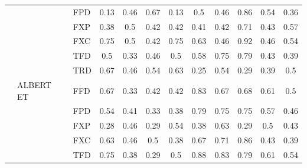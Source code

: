 \documentclass[a4paper, nobind]{templates/ociamthesis}
\begin{document}
\begin{landscape}
\begin{table}[!h]
\begin{threeparttable}
\begin{tabular}[t]{lllcc>{}c|cc>{}c|ccc}
\hspace{1em} &  & FPD & 0.13 & 0.46 & 0.67 & 0.13 & 0.5 & 0.46 & 0.86 & 0.54 & 0.36\\

\hspace{1em} &  & FXP & 0.38 & 0.5 & 0.42 & 0.42 & 0.41 & 0.42 & 0.71 & 0.43 & 0.57\\

\hspace{1em} &  & FXC & 0.75 & 0.5 & 0.42 & 0.75 & 0.63 & 0.46 & 0.92 & 0.46 & 0.54\\

\hspace{1em} &  & TFD & 0.5 & 0.33 & 0.46 & 0.5 & 0.58 & 0.75 & 0.79 & 0.43 & 0.39\\

\hspace{1em} &  & TRD & 0.67 & 0.46 & 0.54 & 0.63 & 0.25 & 0.54 & 0.29 & 0.39 & 0.5\\
\cmidrule{2-12}
\hspace{1em} & ALBERT ET & FFD & 0.67 & 0.33 & 0.42 & 0.42 & 0.83 & 0.67 & 0.68 & 0.61 & 0.5\\

\hspace{1em} &  & FPD & 0.54 & 0.41 & 0.33 & 0.38 & 0.79 & 0.75 & 0.75 & 0.57 & 0.46\\

\hspace{1em} &  & FXP & 0.28 & 0.46 & 0.29 & 0.54 & 0.38 & 0.63 & 0.29 & 0.5 & 0.43\\

\hspace{1em} &  & FXC & 0.63 & 0.46 & 0.5 & 0.38 & 0.67 & 0.71 & 0.86 & 0.43 & 0.39\\

\hspace{1em} &  & TFD & 0.75 & 0.38 & 0.29 & 0.5 & 0.88 & 0.83 & 0.79 & 0.61 & 0.54\\


\end{tabular}
\end{threeparttable}
\end{table}
\end{landscape}
\end{document}
